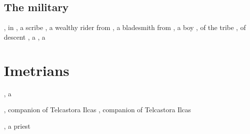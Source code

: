 \subsection{The military}
\begin{dramatispersonae}
  , in 
  , a scribe
  , 
    a wealthy  rider from \Redglen 
  , a bladesmith from \Redglen 
  , a \Goyden{} boy
  \dramitem[Tsekkect]{\Tsekkect}{\meccaran}{\female}, 
    of the  tribe 
  , of  descent
  , a 
  , a 
\end{dramatispersonae}



\section{Imetrians}
\begin{dramatispersonae}
    {\scatha}{\male}, 
    a  
  \begin{subdramatispersonae}
    \nycan\female, companion of Telcastora Ilcas
    \nycan\male, companion of Telcastora Ilcas
  \end{subdramatispersonae}
  , 
    a priest 
\end{dramatispersonae}



